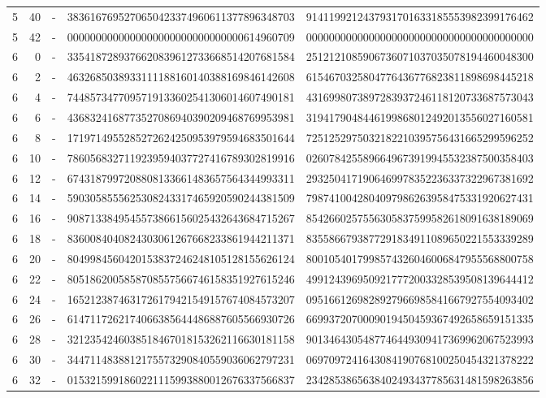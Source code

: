 \begin{longtable}{rrrll}
5 & 40 & - & 3836167695270650423374960611377896348703 & 9141199212437931701633185553982399176462 \\
5 & 42 & - & 0000000000000000000000000000000614960709 & 0000000000000000000000000000000000000000 \\
6 & 0 & - & 3354187289376620839612733668514207681584 & 2512121085906736071037035078194460048300 \\
6 & 2 & - & 4632685038933111188160140388169846142608 & 6154670325804776436776823811898698445218 \\
6 & 4 & - & 7448573477095719133602541306014607490181 & 4316998073897283937246118120733687573043 \\
6 & 6 & - & 4368324168773527086940390209468769953981 & 3194179048446199868012492013556027160581 \\
6 & 8 & - & 1719714955285272624250953979594683501644 & 7251252975032182210395756431665299596252 \\
6 & 10 & - & 7860568327119239594037727416789302819916 & 0260784255896649673919945532387500358403 \\
6 & 12 & - & 6743187997208808133661483657564344993311 & 2932504171906469978352236337322967381692 \\
6 & 14 & - & 5903058555625308243317465920590244381509 & 7987410042804097986263958475331920627431 \\
6 & 16 & - & 9087133849545573866156025432643684715267 & 8542660257556305837599582618091638189069 \\
6 & 18 & - & 8360084040824303061267668233861944211371 & 8355866793877291834911089650221553339289 \\
6 & 20 & - & 8049984560420153837246248105128155626124 & 8001054017998574326046006847955568800758 \\
6 & 22 & - & 8051862005858708557566746158351927615246 & 4991243969509217772003328539508139644412 \\
6 & 24 & - & 1652123874631726179421549157674084573207 & 0951661269828927966985841667927554093402 \\
6 & 26 & - & 6147117262174066385644486887605566930726 & 6699372070009019450459367492658659151335 \\
6 & 28 & - & 3212354246038518467018153262116630181158 & 9013464305487746449309417369962067523993 \\
6 & 30 & - & 3447114838812175573290840559036062797231 & 0697097241643084190768100250454321378222 \\
6 & 32 & - & 0153215991860221115993880012676337566837 & 2342853865638402493437785631481598263856 \\

\end{longtable}
